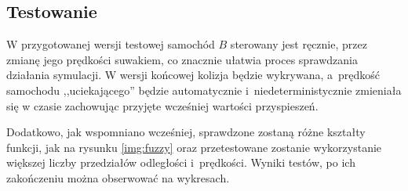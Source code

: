 \documentclass[11pt,a4paper]{article}
\begin{document}
\subsection{Testowanie}
W przygotowanej wersji testowej samochód $B$ sterowany jest ręcznie, przez zmianę jego prędkości suwakiem, co znacznie ułatwia proces sprawdzania działania symulacji. W wersji końcowej kolizja będzie wykrywana, a~prędkość samochodu ,,uciekającego'' będzie automatycznie i~niedeterministycznie zmieniała się w czasie zachowując przyjęte wcześniej wartości przyspieszeń.

Dodatkowo, jak wspomniano wcześniej, sprawdzone zostaną różne kształty funkcji, jak na rysunku \ref{img:fuzzy} oraz przetestowane zostanie wykorzystanie większej liczby przedziałów odległości i~prędkości. Wyniki testów, po ich zakończeniu można obserwować na wykresach.
\end{document}

